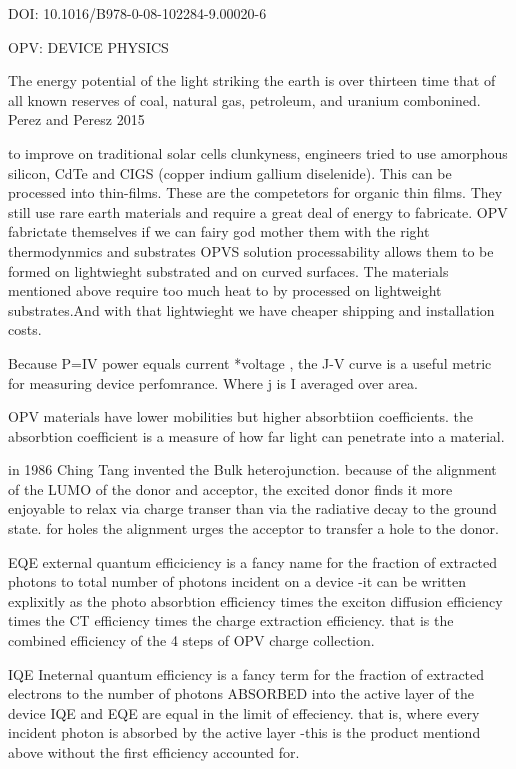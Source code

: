 DOI: 10.1016/B978-0-08-102284-9.00020-6

	OPV: DEVICE PHYSICS

	
    The energy potential of the light striking the earth is over thirteen time that of all known reserves of
    coal, natural gas, petroleum, and uranium combonined. Perez and Peresz 2015

    to improve on traditional solar cells clunkyness, engineers tried to use amorphous silicon, CdTe and CIGS
	(copper indium gallium diselenide). This can be processed into thin-films. These are the 
	competetors for organic thin films. They still use rare earth materials and require
	a great deal of energy to fabricate. OPV fabrictate themselves if we can fairy god mother
	them with the right thermodynmics and substrates 
	OPVS solution processability allows them to be formed on lightwieght substrated and on
	curved surfaces. The materials mentioned above require too much heat to by processed on
	lightweight substrates.And with that lightwieght we have cheaper shipping and
	installation costs.

    Because P=IV power equals current *voltage , the J-V curve is a useful metric for measuring 
	device perfomrance. Where j is I averaged over area. 

    OPV materials have lower mobilities but higher absorbtiion coefficients. the absorbtion coefficient
	is a measure of how far light can penetrate into a material. 

   in 1986 Ching Tang invented the Bulk heterojunction. because of the alignment of the LUMO of the
	donor and acceptor, the excited donor finds it more enjoyable to relax via charge transer than 
	via the radiative decay to the  ground state. for holes the alignment urges the acceptor to
	transfer a hole to the donor.

   EQE external quantum efficiciency is a fancy name for the fraction of extracted photons
	to total number of photons incident on a device
		-it can be written explixitly as the photo absorbtion efficiency times
		the exciton diffusion efficiency times the CT efficiency times the 
		charge extraction efficiency. that is the combined efficiency of
		the 4 steps of OPV charge collection. 

   IQE Ineternal quantum efficiency is a fancy term for the fraction of extracted electrons
	to the number of photons ABSORBED into the active layer of the device IQE and
	EQE are equal in the limit of effeciency. that is, where every incident photon is 
	absorbed by the active layer 
		-this is the product mentiond above without the first efficiency accounted for. 

